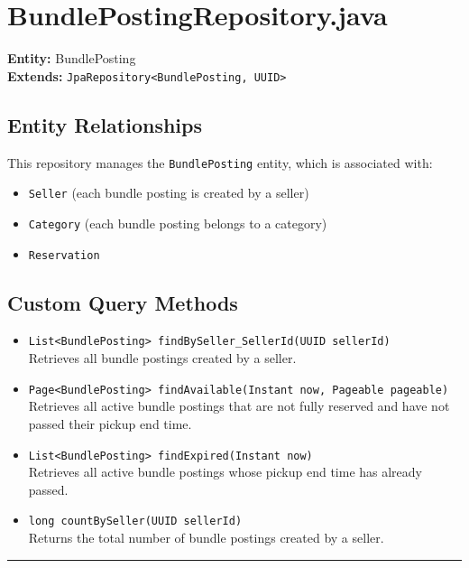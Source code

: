 \documentclass[12pt]{article}
\begin{document}
\section{BundlePostingRepository.java}

\textbf{Entity:} BundlePosting \\
\textbf{Extends:} \texttt{JpaRepository<BundlePosting, UUID>}

\subsection*{Entity Relationships}
This repository manages the \texttt{BundlePosting} entity, which is associated with:
\begin{itemize}
    \item \texttt{Seller} (each bundle posting is created by a seller)
    \item \texttt{Category} (each bundle posting belongs to a category)
    \item \texttt{Reservation}
\end{itemize}

\subsection*{Custom Query Methods}
\begin{itemize}
    \item \texttt{List<BundlePosting> findBySeller\_SellerId(UUID sellerId)} \\
    Retrieves all bundle postings created by a seller.

    \item \texttt{Page<BundlePosting> findAvailable(Instant now, Pageable pageable)} \\
    Retrieves all active bundle postings that are not fully reserved and have not passed their pickup end time.

    \item \texttt{List<BundlePosting> findExpired(Instant now)} \\
    Retrieves all active bundle postings whose pickup end time has already passed.

    \item \texttt{long countBySeller(UUID sellerId)} \\
    Returns the total number of bundle postings created by a seller.
\end{itemize}

\hrule
\vspace{1em}
\end{document}

